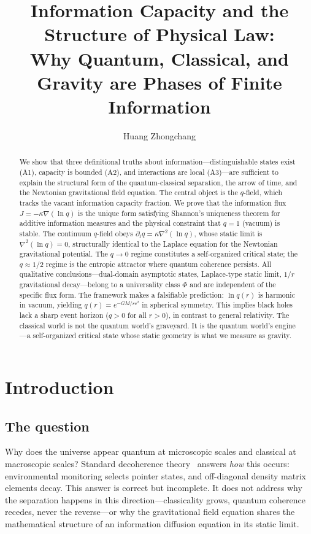 \documentclass[reprint]{revtex4-2}
\begin{document}
\title{Information Capacity and the Structure of Physical Law: \\
Why Quantum, Classical, and Gravity are Phases of Finite Information}

\author{Huang Zhongchang}

\begin{abstract}
We show that three definitional truths about information---distinguishable states exist (A1), capacity is bounded (A2), and interactions are local (A3)---are sufficient to explain the structural form of the quantum-classical separation, the arrow of time, and the Newtonian gravitational field equation. The central object is the $q$-field, which tracks the vacant information capacity fraction. We prove that the information flux $J = -\kappa\nabla(\ln q)$ is the unique form satisfying Shannon's uniqueness theorem for additive information measures and the physical constraint that $q=1$ (vacuum) is stable. The continuum $q$-field obeys $\partial_t q = \kappa\nabla^2(\ln q)$, whose static limit is $\nabla^2(\ln q)=0$, structurally identical to the Laplace equation for the Newtonian gravitational potential. The $q\to 0$ regime constitutes a self-organized critical state; the $q\approx 1/2$ regime is the entropic attractor where quantum coherence persists. All qualitative conclusions---dual-domain asymptotic states, Laplace-type static limit, $1/r$ gravitational decay---belong to a universality class $\Phi$ and are independent of the specific flux form. The framework makes a falsifiable prediction: $\ln q(r)$ is harmonic in vacuum, yielding $q(r)=e^{-GM/rc^2}$ in spherical symmetry. This implies black holes lack a sharp event horizon ($q>0$ for all $r>0$), in contrast to general relativity. The classical world is not the quantum world's graveyard. It is the quantum world's engine---a self-organized critical state whose static geometry is what we measure as gravity.
\end{abstract}

\section{Introduction}

\subsection{The question}

Why does the universe appear quantum at microscopic scales and classical at macroscopic scales? Standard decoherence theory~\cite{Zurek2003,Schlosshauer2007} answers \emph{how} this occurs: environmental monitoring selects pointer states, and off-diagonal density matrix elements decay. This answer is correct but incomplete. It does not address why the separation happens in this direction---classicality grows, quantum coherence recedes, never the reverse---or why the gravitational field equation shares the mathematical structure of an information diffusion equation in its static limit.
\end{document}
